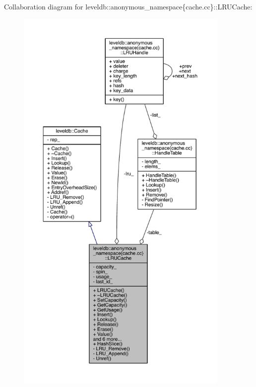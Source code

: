 Collaboration diagram for leveldb\+:\+:anonymous\+\_\+namespace\{cache.\+cc\}\+:\+:L\+R\+U\+Cache\+:
\nopagebreak
\begin{figure}[H]
\begin{center}
\leavevmode
\includegraphics[height=550pt]{classleveldb_1_1anonymous__namespace_02cache_8cc_03_1_1_l_r_u_cache__coll__graph}
\end{center}
\end{figure}
